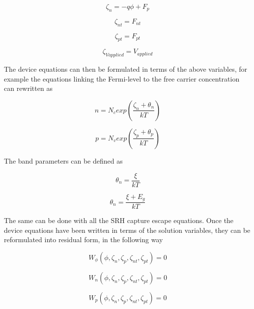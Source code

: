 \documentclass[11pt]{article}
\begin{document}
\begin{equation}
\zeta_n=-{q\phi +F_{p}}
\end{equation}

\begin{equation}
\zeta_{nt}={F_{nt}}
\end{equation}

\begin{equation}
\zeta_{pt}={F_{pt}}
\end{equation}

\begin{equation}
\zeta_{Vapplied}=V_{applied}
\end{equation}

The device equations can then be formulated in terms of the above variables, for example the equations linking the Fermi-level to the free carrier concentration can rewritten as

\begin{equation}
n=N_{c}exp(\frac{\zeta_n+\theta_n}{kT})
\end{equation}

\begin{equation}
p=N_{v}exp(\frac{\zeta_p+\theta_p}{kT})
\end{equation}

The band parameters can be defined as

\begin{equation}
\theta_{n}=\frac{\xi}{kT}
\end{equation}

\begin{equation}
\theta_{n}=\frac{\xi+E_{g}}{kT}
\end{equation}

The same can be done with all the SRH capture escape equations.  Once the device equations have been written in terms of the solution variables, they can be reformulated into residual form, in the following way

\begin{equation}
W_{\phi}(\phi,\zeta_{n},\zeta_{p},\zeta_{nt},\zeta_{pt})=0
\end{equation}

\begin{equation}
W_{n}(\phi,\zeta_{n},\zeta_{p},\zeta_{nt},\zeta_{pt})=0
\end{equation}

\begin{equation}
W_{p}(\phi,\zeta_{n},\zeta_{p},\zeta_{nt},\zeta_{pt})=0
\end{equation}
\end{document}
